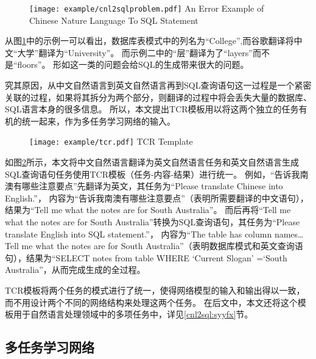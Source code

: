\begin{figure}[!htp]
    \centering
    \texttt{[image: example/cnl2sqlproblem.pdf]}
      {An Error Example of Chinese Nature Language To SQL Statement}
    \label{fig:cnl2sqlproblem}
  \end{figure}

从图\ref{fig:cnl2sqlproblem}中的示例一可以看出，数据库表模式中的列名为“College”,而谷歌翻译将中文“大学”翻译为“University”。
而示例二中的“层”翻译为了“layers”而不是“floors”。
形如这一类的问题会给SQL的生成带来很大的问题。

究其原因，从中文自然语言到英文自然语言再到SQL查询语句这一过程是一个紧密关联的过程，如果将其拆分为两个部分，则翻译的过程中将会丢失大量的数据库、SQL语言本身的很多信息。
所以，本文提出TCR模板用以将这两个独立的任务有机的统一起来，作为多任务学习网络的输入。

\begin{figure}[!htp]
    \centering
    \texttt{[image: example/tcr.pdf]}
      {TCR Template}
    \label{fig:cnl2sqltcr}
  \end{figure}
如图\ref{fig:cnl2sqltcr}所示，本文将中文自然语言翻译为英文自然语言任务和英文自然语言生成SQL查询语句任务使用TCR模板（任务-内容-结果）进行统一。
例如，“告诉我南澳有哪些注意要点”先翻译为英文，其任务为“Please translate Chinese into English.”，
内容为“告诉我南澳有哪些注意要点”（表明所需要翻译的中文语句），结果为“Tell me what the notes are for South Australia”。
而后再将“Tell me what the notes are for South Australia”转换为SQL查询语句，其任务为“Please translate English into SQL statement.”，
内容为“The table has column names… Tell me what the notes are for South Australia”（表明数据库模式和英文查询语句），结果为“SELECT notes from table WHERE ‘Current Slogan’ =‘South Australia”，从而完成生成的全过程。

TCR模板将两个任务的模式进行了统一，使得网络模型的输入和输出得以一致，而不用设计两个不同的网络结构来处理这两个任务。
在后文中，本文还将这个模板用于自然语言处理领域中的多项任务中，详见\ref{cnl2sql:syyfx}节。

\subsection{多任务学习网络}

